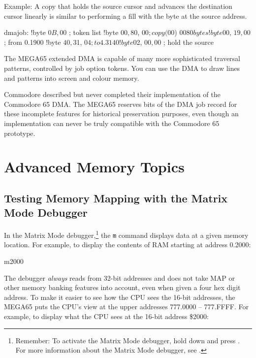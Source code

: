 Example: A copy that holds the source cursor and advances the
destination cursor linearly is similar to performing a fill with the byte at
the source address.

\begin{asmcode}
dmajob:
!byte $0B, $00       ; token list
!byte $00, $80, $00  ; copy ($00) $0080 bytes
!byte $00, $19, $00  ; from 0.1900
!byte $40, $31, $04  ; to 4.3140
!byte $02, $00, $00  ; hold the source
\end{asmcode}

The MEGA65 extended DMA is capable of many more sophisticated traversal
patterns, controlled by job option tokens. You can use the DMA to draw lines
and patterns into screen and colour memory.

Commodore described but never completed their implementation of the Commodore
65 DMA. The MEGA65 reserves bits of the DMA job record for these incomplete
features for historical preservation purposes, even though an implementation
can never be truly compatible with the Commodore 65 prototype.


\newpage
\section{Advanced Memory Topics}

\subsection{Testing Memory Mapping with the Matrix Mode Debugger}

In the Matrix Mode debugger,\footnote{Remember: To activate the Matrix Mode
debugger, hold down \megasymbolkey and press . For more
information about the Matrix Mode debugger, see .}
the \texttt{m} command displays data at a given memory location. For example,
to display the contents of RAM starting at address 0.2000:

\begin{basiccode}
m2000
\end{basiccode}

The debugger {\em always} reads from 32-bit addresses and does not take MAP or
other memory banking features into account, even when given a four hex digit
address. To make it easier to see how the CPU sees the 16-bit addresses, the
MEGA65 puts the CPU's view at the upper addresses 777.0000 -- 777.FFFF. For
example, to display what the CPU sees at the 16-bit address \$2000:

